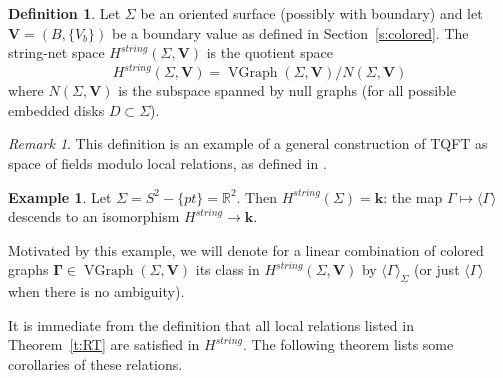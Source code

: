 \documentclass{amsart}
\theoremstyle{definition}
\newtheorem{definition}[theorem]{Definition}
\newtheorem{example}[theorem]{Example}
\theoremstyle{remark}
\newtheorem{remark}[theorem]{Remark}
\numberwithin{equation}{section}
\newcommand{\thref}[1]{Theorem~{\rm\ref{#1}}}
\newcommand{\seref}[1]{Section~{\rm\ref{#1}}}
\newcommand{\<}{\langle}
\renewcommand{\>}{\rangle}
\newcommand{\kk}{\mathbf{k}}       %
\newcommand{\R}{\mathbb{R}}       %
\newcommand{\VV}{\mathbf{V}}       %
\newcommand{\Ga}{\Gamma}
\newcommand{\Si}{\Sigma}
\newcommand{\Hs}{H^{string}}
\DeclareMathOperator{\VGr}{VGraph}
\begin{document}
\begin{definition}\label{d:string-net}
 Let $\Si$ be an oriented surface (possibly with boundary) and let 
 $\VV=(B, \{V_b\})$ be a boundary value as defined in  \seref{s:colored}. 
 The string-net space $\Hs(\Si, \VV)$ is the quotient space 
  $$
   \Hs(\Si, \VV)=\VGr(\Si, \VV)/N(\Si, \VV)
  $$
  where $N(\Si, \VV)$ is  the subspace spanned by null graphs 
  (for all possible embedded disks  $D\subset \Si$). 
\end{definition}

\begin{remark}
  This definition is an example  of a general construction of TQFT as 
  space of fields modulo local relations, as  defined in
 .
\end{remark}

\begin{example}\label{x:R2}
  Let $\Si=S^2-\{pt\}=\R^2$. Then $\Hs(\Si)=\kk$: the map $\Ga\mapsto
  \<\Ga\>$ descends to  an isomorphism $\Hs\to\kk$.
\end{example}

Motivated by this example, we will denote for a linear combination 
of  colored graphs $\mathbf{\Ga}\in \VGr(\Si, \VV)$ its class in $\Hs(\Si,
\VV)$  by  $\<\Ga\>_\Si$ (or just $\<\Ga\>$ when there is no ambiguity).




It is immediate from the definition that all local  relations listed in
\thref{t:RT} are satisfied in $\Hs$. The following theorem lists some
corollaries of these  relations.
\end{document}

